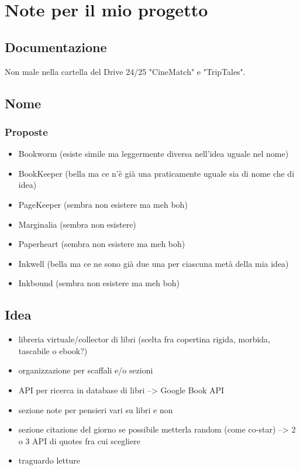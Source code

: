 
\chapter{Note per il mio progetto}
\section{Documentazione}
\par Non male nella cartella del Drive 24/25 "CineMatch" e "TripTales".

\section{Nome}
\subsection{Proposte}
\begin{itemize}
    \item Bookworm (esiste simile ma leggermente diversa nell'idea uguale nel nome)
    \item BookKeeper (bella ma ce n'è già una praticamente uguale sia di nome che di idea)
    \item PageKeeper (sembra non esistere ma meh boh)
    \item Marginalia (sembra non esistere)
    \item Paperheart (sembra non esistere ma meh boh)
    \item Inkwell (bella ma ce ne sono già due una per ciascuna metà della mia idea)
    \item Inkbound (sembra non esistere ma meh boh)
\end{itemize}

\section{Idea}
\begin{itemize}
    \item libreria virtuale/collector di libri (scelta fra copertina rigida, morbida, tascabile o ebook?)
    \item organizzazione per scaffali e/o sezioni
    \item API per ricerca in database di libri --> Google Book API
    \item sezione note per pensieri vari su libri e non
    \item sezione citazione del giorno se possibile metterla random (come co-star) --> 2 o 3 API di quotes fra cui scegliere
    \item traguardo letture
\end{itemize}

